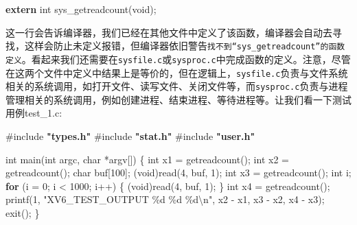 \documentclass[
]{article}
\newenvironment{Shaded}{}{}
\newcommand{\ControlFlowTok}[1]{\textcolor[rgb]{0.00,0.44,0.13}{\textbf{#1}}}
\newcommand{\DataTypeTok}[1]{\textcolor[rgb]{0.56,0.13,0.00}{#1}}
\newcommand{\DecValTok}[1]{\textcolor[rgb]{0.25,0.63,0.44}{#1}}
\newcommand{\ImportTok}[1]{\textcolor[rgb]{0.00,0.50,0.00}{\textbf{#1}}}
\newcommand{\KeywordTok}[1]{\textcolor[rgb]{0.00,0.44,0.13}{\textbf{#1}}}
\newcommand{\NormalTok}[1]{#1}
\newcommand{\OperatorTok}[1]{\textcolor[rgb]{0.40,0.40,0.40}{#1}}
\newcommand{\PreprocessorTok}[1]{\textcolor[rgb]{0.74,0.48,0.00}{#1}}
\newcommand{\SpecialCharTok}[1]{\textcolor[rgb]{0.25,0.44,0.63}{#1}}
\newcommand{\StringTok}[1]{\textcolor[rgb]{0.25,0.44,0.63}{#1}}
\begin{document}
\begin{Shaded}
	\begin{Highlighting}[]
		\KeywordTok{extern} \DataTypeTok{int}\NormalTok{ sys\_getreadcount}\OperatorTok{(}\DataTypeTok{void}\OperatorTok{);}
	\end{Highlighting}
\end{Shaded}

这一行会告诉编译器，我们已经在其他文件中定义了该函数，编译器会自动去寻找，这样会防止未定义报错，但编译器依旧警告\texttt{找不到“sys\_getreadcount”的函数定义}。看起来我们还需要在\texttt{sysfile.c}或\texttt{sysproc.c}中完成函数的定义。注意，尽管在这两个文件中定义中结果上是等价的，但在逻辑上，\texttt{sysfile.c}负责与文件系统相关的系统调用，如打开文件、读写文件、关闭文件等，而\texttt{sysproc.c}负责与进程管理相关的系统调用，例如创建进程、结束进程、等待进程等。让我们看一下测试用例test\_1.c:

\begin{Shaded}
	\begin{Highlighting}[]
		\PreprocessorTok{\#include }\ImportTok{"types.h"}
		\PreprocessorTok{\#include }\ImportTok{"stat.h"}
		\PreprocessorTok{\#include }\ImportTok{"user.h"}

		\DataTypeTok{int}\NormalTok{ main}\OperatorTok{(}\DataTypeTok{int}\NormalTok{ argc}\OperatorTok{,} \DataTypeTok{char} \OperatorTok{*}\NormalTok{argv}\OperatorTok{[])}
		\OperatorTok{\{}
		\DataTypeTok{int}\NormalTok{ x1 }\OperatorTok{=}\NormalTok{ getreadcount}\OperatorTok{();}
		\DataTypeTok{int}\NormalTok{ x2 }\OperatorTok{=}\NormalTok{ getreadcount}\OperatorTok{();}
		\DataTypeTok{char}\NormalTok{ buf}\OperatorTok{[}\DecValTok{100}\OperatorTok{];}
		\OperatorTok{(}\DataTypeTok{void}\OperatorTok{)}\NormalTok{read}\OperatorTok{(}\DecValTok{4}\OperatorTok{,}\NormalTok{ buf}\OperatorTok{,} \DecValTok{1}\OperatorTok{);}
		\DataTypeTok{int}\NormalTok{ x3 }\OperatorTok{=}\NormalTok{ getreadcount}\OperatorTok{();}
		\DataTypeTok{int}\NormalTok{ i}\OperatorTok{;}
		\ControlFlowTok{for} \OperatorTok{(}\NormalTok{i }\OperatorTok{=} \DecValTok{0}\OperatorTok{;}\NormalTok{ i }\OperatorTok{\textless{}} \DecValTok{1000}\OperatorTok{;}\NormalTok{ i}\OperatorTok{++)}
		\OperatorTok{\{}
		\OperatorTok{(}\DataTypeTok{void}\OperatorTok{)}\NormalTok{read}\OperatorTok{(}\DecValTok{4}\OperatorTok{,}\NormalTok{ buf}\OperatorTok{,} \DecValTok{1}\OperatorTok{);}
		\OperatorTok{\}}
		\DataTypeTok{int}\NormalTok{ x4 }\OperatorTok{=}\NormalTok{ getreadcount}\OperatorTok{();}
		\NormalTok{  printf}\OperatorTok{(}\DecValTok{1}\OperatorTok{,} \StringTok{"XV6\_TEST\_OUTPUT }\SpecialCharTok{\%d}\StringTok{ }\SpecialCharTok{\%d}\StringTok{ }\SpecialCharTok{\%d\textbackslash{}n}\StringTok{"}\OperatorTok{,}\NormalTok{ x2 }\OperatorTok{{-}}\NormalTok{ x1}\OperatorTok{,}\NormalTok{ x3 }\OperatorTok{{-}}\NormalTok{ x2}\OperatorTok{,}\NormalTok{ x4 }\OperatorTok{{-}}\NormalTok{ x3}\OperatorTok{);}
		\NormalTok{  exit}\OperatorTok{();}
		\OperatorTok{\}}
	\end{Highlighting}
\end{Shaded}
\end{document}
